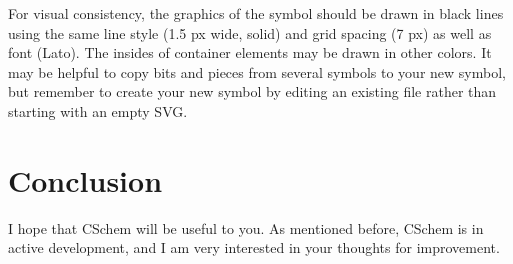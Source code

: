 \documentclass[11pt]{report}
\begin{document}
For visual consistency, the graphics of the symbol should be drawn in
black lines using the same line style (1.5 px wide, solid) and grid
spacing (7 px) as well as font (Lato). The insides of container
elements may be drawn in other colors. It may be helpful to copy bits
and pieces from several symbols to your new symbol, but remember to
create your new symbol by editing an existing file rather than
starting with an empty SVG.

\chapter{Conclusion}

I hope that CSchem will be useful to you. As mentioned before, CSchem
is in active development, and I am very interested in your thoughts
for improvement.
\end{document}
